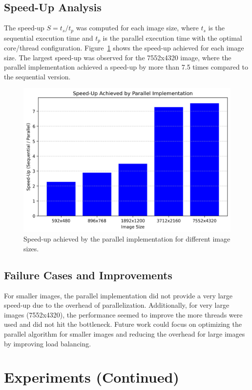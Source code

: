\documentclass[9pt]{IEEEtran}
\begin{document}
\subsection{Speed-Up Analysis}
The speed-up \( S = t_s / t_p \) was computed for each image size, where \( t_s \) is the sequential execution time and \( t_p \) is the parallel execution time with the optimal core/thread configuration. Figure~\ref{fig:speedup} shows the speed-up achieved for each image size. The largest speed-up was observed for the 7552x4320 image, where the parallel implementation achieved a speed-up by more than 7.5 times compared to the sequential version.

\begin{figure}[h]
    \centering
    \includegraphics[width=1\columnwidth]{speedup.png}
    \caption{Speed-up achieved by the parallel implementation for different image sizes.}
    \label{fig:speedup}
\end{figure}

\subsection{Failure Cases and Improvements}
For smaller images, the parallel implementation did not provide a very large speed-up due to the overhead of parallelization. Additionally, for very large images (7552x4320), the performance seemed to improve the more threads were used and did not hit the bottleneck. Future work could focus on optimizing the parallel algorithm for smaller images and reducing the overhead for large images by improving load balancing.

\section{Experiments (Continued)}
\end{document}
